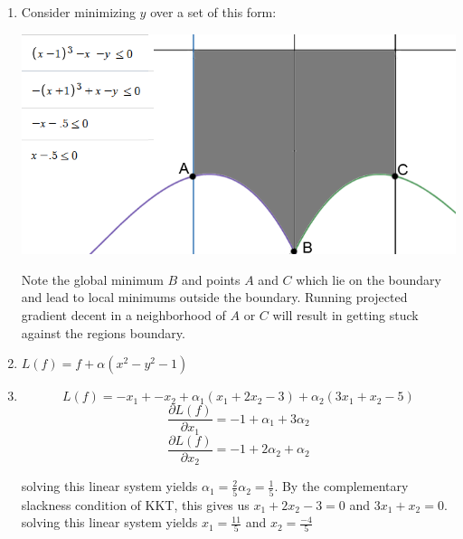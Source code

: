\begin{enumerate}
    \item Consider minimizing $y$ over a set of this form:
    \begin{center}
        \includegraphics[scale=0.5]{images/Chapter4/constrained optimization example.png}
    \end{center}
    Note the global minimum $B$ and points $A$ and $C$ which lie on the boundary and lead to local minimums outside the boundary. Running projected gradient decent in a neighborhood of $A$ or $C$ will result in getting stuck against the regions boundary.
    \item $L(f) = f + \alpha(x^2 - y^2 - 1)$
    \item $$    L(f) = -x_1 + -x_2 + \alpha_1(x_1 + 2x_2 - 3) + \alpha_2(3x_1 +x_2 - 5) $$
    $$    \frac{\partial L(f)}{\partial x_1} = -1 + \alpha_1 + 3\alpha_2 $$
    $$    \frac{\partial L(f)}{\partial x_2} = -1 + 2\alpha_2 + \alpha_2 $$
    
    solving this linear system yields $\alpha_1 =\frac{2}{5} \alpha_2 = \frac{1}{5}$.
    By the complementary slackness condition of KKT, this gives us
    $x_1 +2x_2 - 3 = 0 $ and $3x_1 + x_2 = 0$.
    solving this linear system yields 
    $x_1 = \frac{11}{5}$ and $x_2 = \frac{-4}{5}$
\end{enumerate}